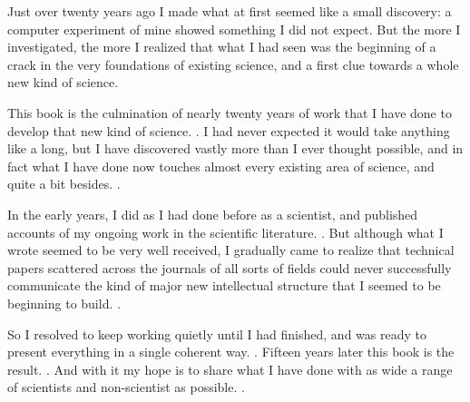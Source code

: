 
Just over twenty years ago I made what at first seemed like a small
discovery: a computer experiment of mine showed something I did not expect.
But the more I investigated, the more I realized that what I had seen was the
beginning of a crack in the very foundations of existing science, and a first
clue towards a whole new kind of science. 

This book is the culmination of nearly twenty years of work that
I have done to develop that new kind of science.
.
I had never expected it
would take anything like a long, but I have discovered vastly more
than I ever thought possible, and in fact what I have done now touches
almost every existing area of science, and quite a bit besides.
.

In the early years, I did as I had done before as a scientist, and
published accounts of my ongoing work in the scientific literature.
.
But
although what I wrote seemed to be very well received, I gradually came
to realize that technical papers scattered across the journals of all sorts of
fields could never successfully communicate the kind of major new
intellectual structure that I seemed to be beginning to build.
.

So I resolved to keep working quietly until I had finished, and
was ready to present everything in a single coherent way. 
.
Fifteen years
later this book is the result.
.
And with it my hope is to share what I have
done with as wide a range of scientists and non-scientist as possible.
.


